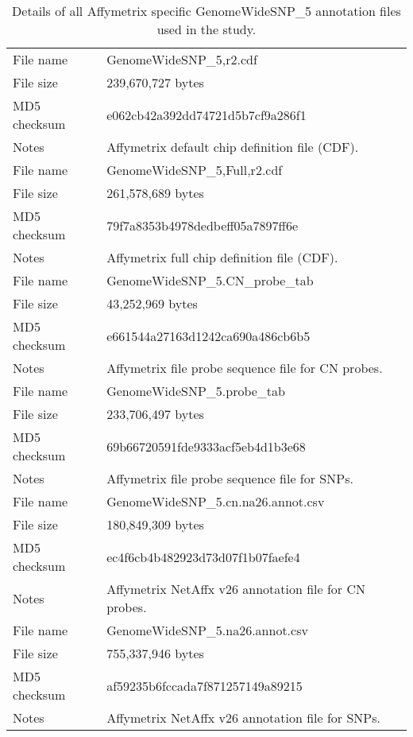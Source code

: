 \documentclass[10pt,a4paper]{article}
\begin{document}
\begin{table}[hp]
\begin{center}
\begin{tabular}{lp{}}
\hline
File name    & GenomeWideSNP\_5,r2.cdf \\
File size    & 239,670,727 bytes \\
MD5 checksum & e062cb42a392dd74721d5b7cf9a286f1 \\
Notes        & Affymetrix default chip definition file (CDF). \\
\hline
File name    & GenomeWideSNP\_5,Full,r2.cdf \\
File size    & 261,578,689 bytes \\
MD5 checksum & 79f7a8353b4978dedbeff05a7897ff6e \\
Notes        & Affymetrix full chip definition file (CDF). \\
\hline
File name    & GenomeWideSNP\_5.CN\_probe\_tab \\
File size    & 43,252,969 bytes \\
MD5 checksum & e661544a27163d1242ca690a486cb6b5 \\
Notes        & Affymetrix file probe sequence file for CN probes. \\
\hline
File name    & GenomeWideSNP\_5.probe\_tab \\
File size    & 233,706,497 bytes \\
MD5 checksum & 69b66720591fde9333acf5eb4d1b3e68 \\
Notes        & Affymetrix file probe sequence file for SNPs. \\
\hline
File name    & GenomeWideSNP\_5.cn.na26.annot.csv \\
File size    & 180,849,309 bytes \\
MD5 checksum & ec4f6cb4b482923d73d07f1b07faefe4 \\
Notes        & Affymetrix NetAffx v26 annotation file for CN probes. \\
\hline
File name    & GenomeWideSNP\_5.na26.annot.csv \\
File size    & 755,337,946 bytes \\
MD5 checksum & af59235b6fccada7f871257149a89215 \\
Notes        & Affymetrix NetAffx v26 annotation file for SNPs. \\
\hline
\end{tabular}
\end{center}
\caption{Details of all Affymetrix specific GenomeWideSNP\_5 annotation files used in the study.}
\label{tblGWSFiveAffymetrix}
\end{table}
\end{document}
